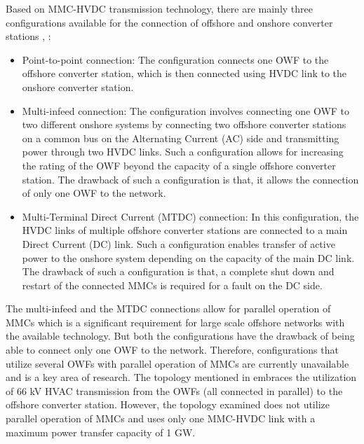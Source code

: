 Based on \gls{MMC}-\gls{HVDC} transmission technology, there are mainly three configurations available for the connection of offshore and onshore converter stations \cite{cigre_B455}, \cite{sharifabadi2016design}: 
\begin{itemize}
    \item Point-to-point connection: The configuration connects one \gls{OWF} to the offshore converter station, which is then connected using \gls{HVDC} link to the onshore converter station.
    \item Multi-infeed connection: The configuration involves connecting one \gls{OWF} to two different onshore systems by connecting two offshore converter stations on a common bus on the Alternating Current (\gls{AC}) side and transmitting power through two \gls{HVDC} links. Such a configuration allows for increasing the rating of the \gls{OWF} beyond the capacity of a single offshore converter station. The drawback of such a configuration is that, it allows the connection of only one \gls{OWF} to the network.
    \item Multi-Terminal Direct
    Current (MTDC) connection: In this configuration, the \gls{HVDC} links of multiple offshore converter stations are connected to a main Direct Current (\gls{DC}) link. Such a configuration enables transfer of active power to the onshore system depending on the capacity of the main \gls{DC} link. The drawback of such a configuration is that, a complete shut down and restart of the connected \gls{MMC}s is required for a fault on the \gls{DC} side.
\end{itemize}

The multi-infeed and the MTDC connections allow for parallel operation of \gls{MMC}s which is a significant requirement for large scale offshore networks with the available technology. But both the configurations have the drawback of being able to connect only one \gls{OWF} to the network. Therefore, configurations that utilize several \gls{OWF}s with parallel operation of \gls{MMC}s are currently unavailable and is a key area of research. The topology mentioned in \cite{lozada_ayala_dynamic_2018} embraces the utilization of 66 kV \gls{HVAC} transmission from the \gls{OWF}s (all connected in parallel) to the offshore converter station. However, the topology examined does not utilize parallel operation of \gls{MMC}s and uses only one \gls{MMC}-\gls{HVDC} link with a maximum power transfer capacity of 1 GW.


